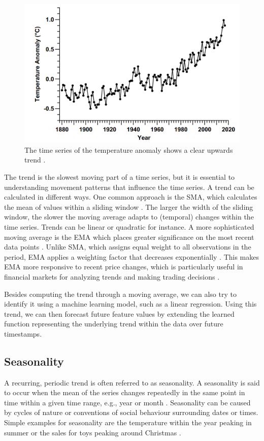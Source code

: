 \begin{figure}[h]
    \centering
    \includegraphics[width=0.75\linewidth]{img/Time Series Trend.png}
    \caption{The time series of the temperature anomaly shows a clear upwards trend
        \parencite[p. 311]{mudelsee2019trend}.}
    \label{fig:ts_trend}
\end{figure}

The trend is the slowest moving part of a time series, but it is essential
to understanding movement patterns that influence the time series. A trend can
be calculated in different ways. One common approach is the \ac{SMA}, which
calculates the mean of values within a sliding window \parencite{klinker2011exponential}.
The larger the width of the sliding window, the slower the moving average adapts
to (temporal) changes within the time series. Trends can be linear or quadratic
for instance. A more sophisticated moving average is the \ac{EMA} which places
greater significance on the most recent data points \parencite{hansun2013new}.
Unlike \ac{SMA}, which assigns equal weight to all observations in the period,
\ac{EMA} applies a weighting factor that decreases exponentially
\parencite{klinker2011exponential}. This makes \ac{EMA} more responsive to
recent price changes, which is particularly useful in financial markets for
analyzing trends and making trading decisions \parencite{dzikevivcius2010ema}.

Besides computing the trend through a moving average, we can also try to identify
it using a machine learning model, such as a linear regression. Using this trend, we
can then forecast future feature values by extending the learned function
representing the underlying trend within the data over future timestamps.

\subsection{Seasonality}
\label{subsec:seasonality}
A recurring, periodic trend is often referred to as seasonality. A seasonality is said to occur when the mean of the series changes repeatedly in the same point in time within a given time range, e.g., year or month \parencite{haben2023time}. Seasonality can be caused by cycles of nature or conventions of social behaviour surrounding dates or times. Simple examples for seasonality are the temperature within the year peaking in summer or the sales for toys peaking around Christmas \parencite{haben2023time}.

